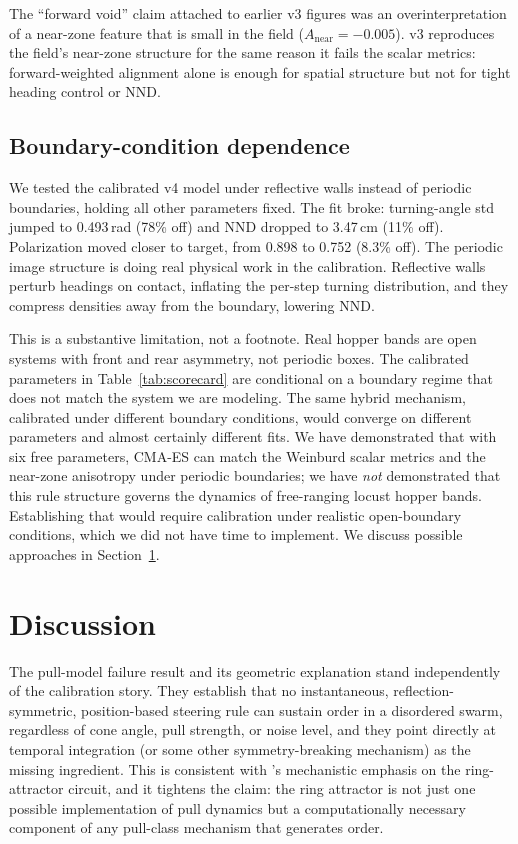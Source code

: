 \documentclass[11pt]{article}
\begin{document}
The ``forward void'' claim attached to earlier v3 figures was an
overinterpretation of a near-zone feature that is small in the field
($A_\text{near} = -0.005$). v3 reproduces the field's near-zone structure
for the same reason it fails the scalar metrics: forward-weighted
alignment alone is enough for spatial structure but not for tight
heading control or NND.

\subsection{Boundary-condition dependence}
\label{sec:boundary}

We tested the calibrated v4 model under reflective walls instead of
periodic boundaries, holding all other parameters fixed. The fit broke:
turning-angle std jumped to 0.493\,rad (78\% off) and NND dropped to
3.47\,cm (11\% off). Polarization moved closer to target, from 0.898 to
0.752 (8.3\% off). The periodic image structure is doing real physical
work in the calibration. Reflective walls perturb headings on contact,
inflating the per-step turning distribution, and they compress densities
away from the boundary, lowering NND.

This is a substantive limitation, not a footnote. Real hopper bands are
open systems with front and rear asymmetry, not periodic boxes. The
calibrated parameters in Table~\ref{tab:scorecard} are conditional on a
boundary regime that does not match the system we are modeling. The same
hybrid mechanism, calibrated under different boundary conditions, would
converge on different parameters and almost certainly different fits.
We have demonstrated that with six free parameters, CMA-ES can match the
Weinburd scalar metrics and the near-zone anisotropy under periodic
boundaries; we have \emph{not} demonstrated that this rule structure
governs the dynamics of free-ranging locust hopper bands. Establishing
that would require calibration under realistic open-boundary conditions,
which we did not have time to implement. We discuss possible approaches
in Section~\ref{sec:discussion}.

\section{Discussion}
\label{sec:discussion}

The pull-model failure result and its geometric explanation stand
independently of the calibration story. They establish that no
instantaneous, reflection-symmetric, position-based steering rule can
sustain order in a disordered swarm, regardless of cone angle, pull
strength, or noise level, and they point directly at temporal integration
(or some other symmetry-breaking mechanism) as the missing ingredient.
This is consistent with \citet{sayin2025}'s mechanistic emphasis on the
ring-attractor circuit, and it tightens the claim: the ring attractor
is not just one possible implementation of pull dynamics but a
computationally necessary component of any pull-class mechanism that
generates order.
\end{document}
